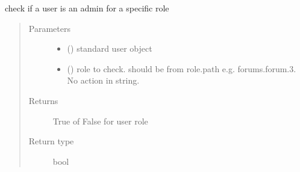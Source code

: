 \documentclass[letterpaper,10pt,english]{sphinxmanual}
\begin{document}
\begin{fulllineitems}
\label{\detokenize{rbac:rbac.core.rbac_user_is_role_admin}}
check if a user is an admin for a specific role
\begin{quote}\begin{description}
\item[{Parameters}] \leavevmode\begin{itemize}
\item {} 
 ({\hyperref[\detokenize{accounts:accounts.models.User}]{}}) \textendash{} standard user object

\item {} 
 () \textendash{} role to check. should be from role.path e.g. forums.forum.3. No action in string.

\end{itemize}

\item[{Returns}] \leavevmode
True of False for user role

\item[{Return type}] \leavevmode
bool

\end{description}\end{quote}

\end{fulllineitems}

\end{document}
